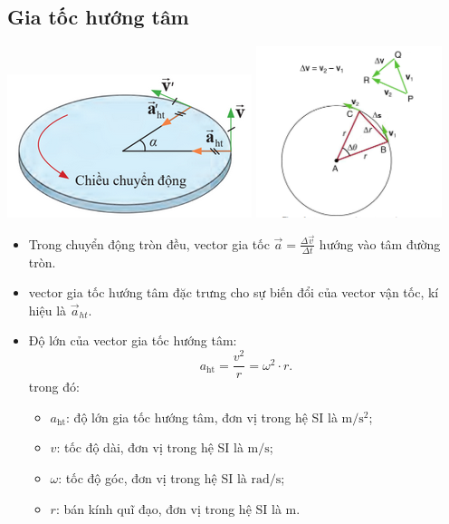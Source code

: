\subsection{Gia tốc hướng tâm}
\begin{center}
	\includegraphics[scale=1]{../figs/G10-027-1}
	\includegraphics[height=5cm]{../figs/G10-027-1b}
\end{center}
\begin{itemize}
	\item Trong chuyển động tròn đều, vector gia tốc $\vec{a}=\frac{\Delta\vec{v}}{\Delta t}$  hướng vào  tâm đường tròn.
	\item vector gia tốc hướng tâm đặc trưng cho sự biến đổi của vector vận tốc, kí hiệu là $\vec{a}_{ht}$.
	\item Độ lớn của vector gia tốc hướng tâm:
	\begin{equation*}
		a_\text{ht}=\frac{v^2}{r}=\omega^2 \cdot r.
	\end{equation*}
	trong đó:
	\begin{itemize}
		\item $a_{\text{ht}}$: độ lớn gia tốc hướng tâm, đơn vị trong hệ SI là $\si{\meter/\second^2}$;
		\item $v$: tốc độ dài, đơn vị trong hệ SI là $\si{\meter/\second}$;
		\item $\omega$: tốc độ góc, đơn vị trong hệ SI là $\si{\radian/\second}$;
		\item $r$: bán kính quĩ đạo, đơn vị trong hệ SI là $\si{\meter}$.
	\end{itemize}
\end{itemize}
